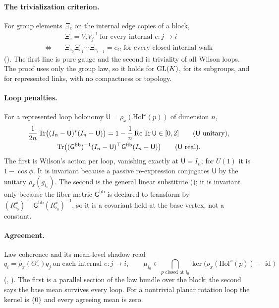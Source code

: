 \paragraph{The trivialization criterion.}
For group elements $\Xi_e$ on the internal edge copies of a block,
\[
\begin{aligned}
&\Xi_e=V_iV_j^{-1}\ \text{for every internal }e:j\to i\\
\Longleftrightarrow\quad&\Xi_{e_0}\Xi_{e_1}\cdots\Xi_{e_{r-1}}=e_G\ \text{for every closed internal walk}
\end{aligned}
\]
(). The first line is pure gauge and the second is triviality of all Wilson
loops. The proof uses only the group law, so it holds for $\mathrm{GL}(K)$, for its subgroups, and for represented
links, with no compactness or topology.

\paragraph{Loop penalties.}
For a represented loop holonomy $\mathsf U=\rho_x(\mathrm{Hol}^x(p))$ of dimension $n$,
\begin{gather*}
\frac{1}{2n}\operatorname{Tr}\bigl((I_n-\mathsf U)^*(I_n-\mathsf U)\bigr)=1-\frac1n\operatorname{Re}\operatorname{Tr}\mathsf U\in[0,2]
\qquad(\mathsf U\text{ unitary}),\\
\operatorname{Tr}\bigl((\mathsf G^{\mathrm{fib}})^{-1}(I_n-\mathsf U)^\top\mathsf G^{\mathrm{fib}}(I_n-\mathsf U)\bigr)
\qquad(\mathsf U\text{ real}).
\end{gather*}
The first is Wilson's action per loop, vanishing exactly at $\mathsf U=I_n$; for $U(1)$ it is $1-\cos\phi$. It
is invariant because a passive re-expression conjugates $\mathsf U$ by the unitary $\rho_x(g_{i_0})$. The second
is the general linear substitute (); it is invariant only because the fiber metric
$\mathsf G^{\mathrm{fib}}$ is declared to transform by
$(R_{i_0}^x)^{-\top}\mathsf G^{\mathrm{fib}}(R_{i_0}^x)^{-1}$, so it is a covariant field at the base vertex,
not a constant.

\paragraph{Agreement.}
Law coherence and its mean-level shadow read
\[
q_i=\widehat\rho_x(\Theta_e^x)q_j\ \text{on each internal }e:j\to i,
\qquad
\mu_{i_0}\in\bigcap_{p\text{ closed at }i_0}\ker\bigl(\rho_x(\mathrm{Hol}^x(p))-\operatorname{id}\bigr)
\]
(, ). The first is a parallel section of the law
bundle over the block; the second says the base mean survives every loop. For a nontrivial planar rotation loop
the kernel is $\{0\}$ and every agreeing mean is zero.

